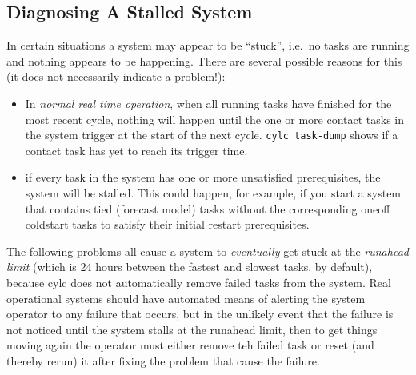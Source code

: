 \documentclass[11pt,a4paper]{article}
\begin{document}
\subsection{Diagnosing A Stalled System}
\label{DiagnosingAStalledSystem}

In certain situations a system may appear to be ``stuck'', i.e.\ no
tasks are running and nothing appears to be happening. There are several 
possible reasons for this (it does not necessarily indicate a problem!):

\begin{itemize}
    \item In {\em normal real time operation}, when all running tasks
        have finished for the most recent cycle, nothing will happen
        until the one or more contact tasks in the system trigger at the
        start of the next cycle. \lstinline=cylc task-dump= shows if a
        contact task has yet to reach its trigger time.

    \item if every task in the system has one or more unsatisfied
        prerequisites, the system will be stalled. This could happen,
        for example, if you start a system that contains tied (forecast
        model) tasks without the corresponding oneoff coldstart tasks to
        satisfy their initial restart prerequisites.

\end{itemize}

The following problems all cause a system to {\em eventually} get stuck 
at the {\em runahead limit} (which is 24 hours between the
fastest and slowest tasks, by default), because cylc does not
automatically remove failed tasks from the system.  Real operational
systems should have automated means of alerting the system operator to
any failure that occurs, but in the unlikely event that the failure 
is not noticed until the system stalls at the runahead limit, then to
get things moving again the operator must either remove teh failed task
or reset (and thereby rerun) it after fixing the problem that cause the
failure.
\end{document}
